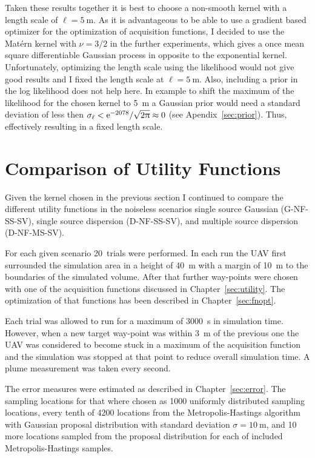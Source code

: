 Taken these results together it is best to choose a non-smooth kernel with 
a length scale of $\ell = \SI{5}{\meter}$. As it is advantageous to be able to 
use a gradient based optimizer for the optimization of acquisition functions, 
I decided to use the Matérn kernel with $\nu = 3/2$ in the further experiments, 
which gives a once mean square differentiable Gaussian process in opposite to 
the exponential kernel. Unfortunately, optimizing the length scale using the 
likelihood would not give good results and I fixed the length scale at $\ell 
= \SI{5}{\meter}$. Also, including a prior in the log likelihood does not help 
here. In example to shift the maximum of the likelihood for the chosen kernel to 
\SI{5}{\meter} a Gaussian prior would need a standard deviation of less then 
$\sigma_{\ell} < \mathrm{e}^{-2078} / \sqrt{2\uppi} \approx 0$ (see 
Apendix~\ref{sec:prior}).  Thus, effectively resulting in a fixed length scale.

\section{Comparison of Utility Functions}\label{sec:cmputility}
Given the kernel chosen in the previous section I continued to compare the 
different utility functions in the noiseless scenarios single source Gaussian 
(G-NF-SS-SV), single source dispersion (D-NF-SS-SV), and multiple source 
dispersion (D-NF-MS-SV).

For each given scenario 20~trials were performed. In each run the UAV first 
surrounded the simulation area in a height of \SI{40}{\meter} with a margin of 
\SI{10}{\meter} to the boundaries of the simulated volume. After that further 
way-points were chosen with one of the acquisition functions discussed in 
Chapter~\ref{sec:utility}. The optimization of that functions has been described 
in Chapter~\ref{sec:fnopt}.

Each trial was allowed to run for a maximum of \SI{3000}{\second} in simulation 
time. However, when a new target way-point was within \SI{3}{\meter} of the 
previous one the UAV was considered to become stuck in a maximum of the 
acquisition function and the simulation was stopped at that point to reduce 
overall simulation time. A plume measurement was taken every second.

The error measures were estimated as described in Chapter~\ref{sec:error}. The 
sampling locations for that where chosen as 1000 uniformly distributed sampling 
locations, every tenth of 4200 locations from the Metropolis-Hastings algorithm 
with Gaussian proposal distribution with standard deviation $\sigma 
= \SI{10}{\meter}$, and 10 more locations sampled from the proposal distribution 
for each of included Metropolis-Hastings samples.

